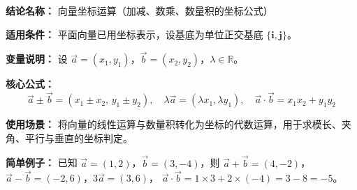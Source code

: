 \textbf{结论名称：} 向量坐标运算（加减、数乘、数量积的坐标公式）

\textbf{适用条件：} 平面向量已用坐标表示，设基底为单位正交基底 \(\{\mathbf{i},\mathbf{j}\}\)。

\textbf{变量说明：} 设 \(\vec{a}=(x_1,y_1)\)，\(\vec{b}=(x_2,y_2)\)，\(\lambda \in \mathbb{R}\)。

\textbf{核心公式：}
\[
\boxed{\vec{a} \pm \vec{b} = (x_1 \pm x_2,\, y_1 \pm y_2),\quad \lambda\vec{a} = (\lambda x_1, \lambda y_1),\quad \vec{a}\cdot\vec{b} = x_1x_2 + y_1y_2}
\]

\textbf{使用场景：} 将向量的线性运算与数量积转化为坐标的代数运算，用于求模长、夹角、平行与垂直的坐标判定。

\textbf{简单例子：} 已知 \(\vec{a}=(1,2)\)，\(\vec{b}=(3,-4)\)，则
\(\vec{a}+\vec{b}=(4,-2)\)，\(\vec{a}-\vec{b}=(-2,6)\)，\(3\vec{a}=(3,6)\)，
\(\vec{a}\cdot\vec{b}=1\times3+2\times(-4)=3-8=-5\)。